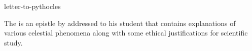 \documentclass{stex}
\begin{document}
\begin{smodule}{letter-to-pythocles}
\begin{sparagraph}[style=symdoc]
The  is an epistle by  addressed to
his student  that contains explanations of various celestial phenomena along with some ethical justifications for scientific study.
\end{sparagraph}
\end{smodule}
\end{document}
